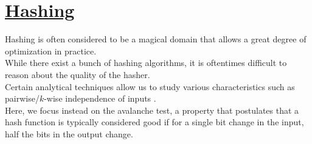 \documentclass[12pt]{article}
\begin{document}




\section{\hyperref[sec:hashing]{Hashing}}\label{sec:hashing-detail}

Hashing is often considered to be a magical domain that allows a great degree of optimization in practice. \\
While there exist a bunch of hashing algorithms, it is oftentimes difficult to reason about the quality of the hasher. \\
Certain analytical techniques allow us to study various characteristics such as pairwise/$k$-wise independence of inputs \cite{universal_hashing}. \\
Here, we focus instead on the avalanche test\cite{avalanche_effect}, a property that postulates that a hash function is typically considered good if for a single bit change in the input, half the bits in the output change.
\end{document}
